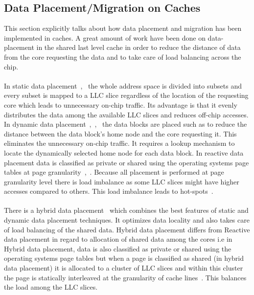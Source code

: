 \documentclass{listhesis}
\begin{document}
\subsection{Data Placement/Migration on Caches}
This section explicitly talks about how data placement and migration has been implemented in caches. 
A great amount of work have been done on data-placement in the shared last level cache in order to reduce the distance of data from the core requesting the data and to take care of load balancing across the chip.\\
\\
In static data placement~\cite{cacheDataPlacement1},~\cite{cacheDataPlacement2} the whole address space is divided into subsets and every subset is mapped to a LLC slice regardless of the location of the requesting core which leads to unnecessary on-chip traffic. Its advantage is that it evenly distributes the data among the available LLC slices and reduces off-chip accesses. In dynamic data placement~\cite{cacheDataPlacement1},~\cite{cacheDataPlacement3},~\cite{cacheDataPlacement4} the data blocks are placed such as to reduce the distance between the data block's home node and the core requesting it. This eliminates the unnecessary on-chip traffic. It requires a lookup mechanism to locate the dynamically selected home node for each data block. In reactive data placement data is classified as private or shared using the operating systems page tables at page granularity~\cite{cacheDataPlacement4},~\cite{cacheDataPlacement6}. Because all placement is performed at page granularity level there is load imbalance as some LLC slices might have higher accesses compared to others. This load imbalance leads to hot-spots~\cite{cacheDataPlacement6}.\\
\\
There is a hybrid data placement~\cite{cacheDataPlacement6} which combines the best features of static and dynamic data placement techniques. It optimizes data locality and also takes care of load balancing of the shared data. Hybrid data placement differs from Reactive data placement in regard to allocation of shared data among the cores i.e in Hybrid data placement, data is also classified as private or shared using the operating systems page tables but when a page is classified as shared (in hybrid data placement) it is allocated to a cluster of LLC slices and within this cluster the page is statically interleaved at the granularity of cache lines~\cite{cacheDataPlacement6}. This balances the load among the LLC slices.\\
\end{document}
